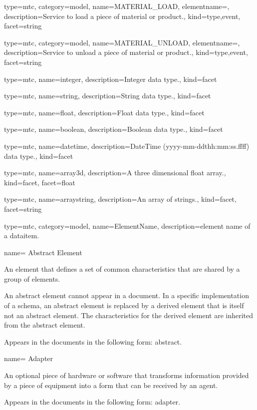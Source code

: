 {
  type=mtc,
  category=model,
  name={MATERIAL\_LOAD},
  elementname=,
  description={Service to load a piece of material or product.},
  kind={type,event},
  facet={\gls{string}}
}


{
  type=mtc,
  category=model,
  name={MATERIAL\_UNLOAD},
  elementname=,
  description={Service to unload a piece of material or product.},
  kind={type,event},
  facet={\gls{string}}
}


{
  type=mtc,
  name={integer},
  description={Integer data type.},
  kind={facet}
}


{
  type=mtc,
  name={string},
  description={String data type.},
  kind={facet}
}


{
  type=mtc,
  name={float},
  description={Float data type.},
  kind={facet}
}


{
  type=mtc,
  name={boolean},
  description={Boolean data type.},
  kind={facet}
}


{
  type=mtc,
  name={datetime},
  description={DateTime (yyyy-mm-ddthh:mm:ss.ffff) data type.},
  kind={facet}
}


{
  type=mtc,
  name={array3d},
  description={A three dimensional \gls{float} array.},
  kind={facet},
  facet={\gls{float}}
}

{
  type=mtc,
  name={arraystring},
  description={An array of \glspl{string}.},
  kind={facet},
  facet={\gls{string}}
}

{
  type=mtc,
  category=model,
  name={ElementName},
  description={\gls{element name} of a \gls{dataitem}.}
}

{
  name= {Abstract Element}
}
{
  An element that defines a set of common characteristics that are shared by a group of elements.
  
  An abstract element cannot appear in a document. In a specific implementation of a schema, an abstract element is replaced by a derived element that is itself not an abstract element. The characteristics for the derived element are inherited from the abstract element. 
  
  Appears in the documents in the following form: abstract.
}


{
  name= {Adapter}
}
{
  An optional piece of hardware or software that transforms information provided by a piece of equipment into a form that can be received by an \gls{agent}.

  Appears in the documents in the following form: adapter.
}


